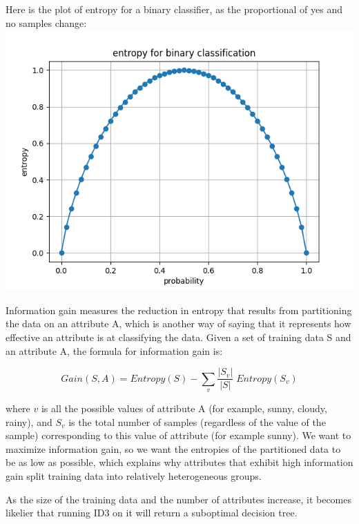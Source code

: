 \documentclass[12pt]{report}
\begin{document}
Here is the plot of entropy for a binary classifier, as the proportional of yes and no samples change:
\includegraphics[scale=0.5]{entroy.png}















Information gain measures the reduction in entropy that results from partitioning the data on an attribute A, which is another way of saying that it represents how effective an attribute is at classifying the data. Given a set of training data S and an attribute A, the formula for information gain is:

\begin{equation}
	Gain(S,A)  = Entropy(S) - \sum_v  \frac{|S_v|}{|S|} \; Entropy(S_v)
\end{equation}

where $v$ is all the possible values of attribute A (for example, sunny, cloudy, rainy), and $S_v$ is the total number of samples (regardless of the value of the sample) corresponding to this value of attribute (for example sunny). We want to maximize information gain, so we want the entropies of the partitioned data to be as low as possible, which explains why attributes that exhibit high information gain split training data into relatively heterogeneous groups.

As the size of the training data and the number of attributes increase, it becomes likelier that running ID3 on it will return a suboptimal decision tree.
\end{document}
